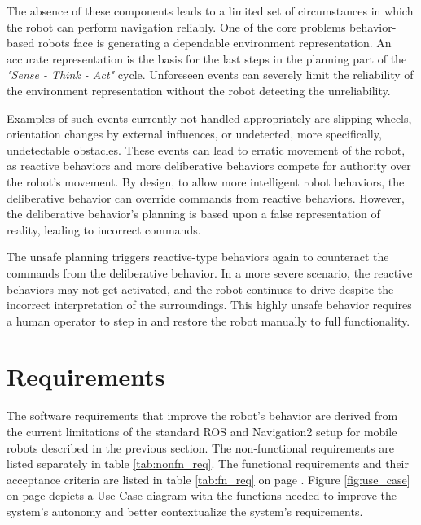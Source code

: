 The absence of these components leads to a limited set of circumstances in which the robot can perform navigation reliably. One of the core problems behavior-based robots face is generating a dependable environment representation. An accurate representation is the basis for the last steps in the planning part of the \textit{"Sense - Think - Act"} cycle. Unforeseen events can severely limit the reliability of the environment representation without the robot detecting the unreliability. 

Examples of such events currently not handled appropriately are slipping wheels, orientation changes by external influences, or undetected, more specifically, undetectable obstacles. These events can lead to erratic movement of the robot, as reactive behaviors and more deliberative behaviors compete for authority over the robot's movement. By design, to allow more intelligent robot behaviors, the deliberative behavior can override commands from reactive behaviors. However, the deliberative behavior's planning is based upon a false representation of reality, leading to incorrect commands. 

The unsafe planning triggers reactive-type behaviors again to counteract the commands from the deliberative behavior. In a more severe scenario, the reactive behaviors may not get activated, and the robot continues to drive despite the incorrect interpretation of the surroundings. This highly unsafe behavior requires a human operator to step in and restore the robot manually to full functionality. 

\section{Requirements}
\label{sec:Requirements}

The software requirements that improve the robot's behavior are derived from the current limitations of the standard ROS and Navigation2 setup for mobile robots described in the previous section. The non-functional requirements are listed separately in table \ref{tab:nonfn_req}. The functional requirements and their acceptance criteria are listed in table \ref{tab:fn_req} on page \pageref{tab:fn_req}. Figure \ref{fig:use_case} on page \pageref{fig:use_case} depicts a Use-Case diagram with the functions needed to improve the system's autonomy and better contextualize the system's requirements.

